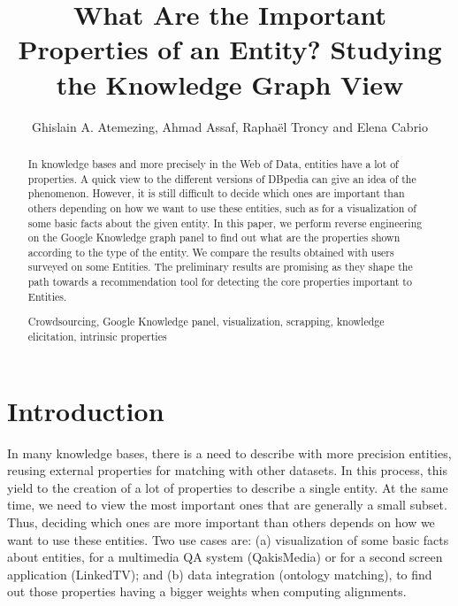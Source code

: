 \documentclass[runningheads,a4paper]{llncs}
\newcommand{\keywords}[1]{\par\addvspace\baselineskip
\noindent\keywordname\enspace\ignorespaces#1}
\begin{document}
\title{What Are the Important Properties of an Entity? Studying the Knowledge Graph View}

\author{Ghislain A. Atemezing, Ahmad Assaf, Rapha\"{e}l Troncy and Elena Cabrio }



\maketitle


\begin{abstract}
In knowledge bases and more precisely in the Web of Data, entities have a lot of properties. A quick view to the different versions of DBpedia can give an idea of the phenomenon. However, it is still difficult to decide which ones are important than others depending on how we want to use these entities, such as for a visualization of some basic facts about the given entity. In this paper, we perform reverse engineering on the Google Knowledge graph panel to find out what are the properties shown according to the type of the entity. We compare the results obtained with users surveyed on some Entities. The preliminary results are promising as they shape the path towards a recommendation tool for detecting the core properties important to Entities.
\keywords{Crowdsourcing, Google Knowledge panel, visualization, scrapping, knowledge elicitation, intrinsic properties}
\end{abstract}


\section{Introduction}
\label{sec:introduction}
In many knowledge bases, there is a need to describe with more precision entities, reusing external properties for matching with other datasets. In this process, this yield to the creation of a lot of properties to describe a single entity. At the same time, we need to view the most important ones that are generally a small subset. Thus, deciding which ones are more important than others depends on how we want to use these entities. Two use cases are:
(a) visualization of some basic facts about entities, for a multimedia QA system (QakisMedia) or for a second screen application (LinkedTV); and (b) data integration (ontology matching), to find out those properties having a bigger weights when computing alignments.
   
\end{document}

